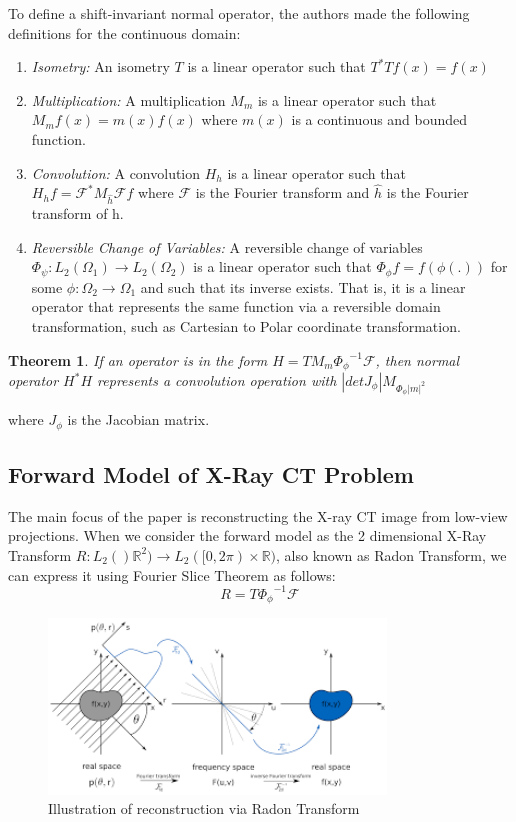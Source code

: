 \documentclass[journal, onecolumn, 11pt]{IEEEtran}
\newtheorem{theorem}{Theorem}
\begin{document}
To define a shift-invariant normal operator, the authors made the following definitions for the continuous domain: 
\begin{enumerate}
    \item \textit{Isometry:} An isometry $T$ is a linear operator such that $T^\ast T {f}(x) = f(x)$
    \item \textit{Multiplication:} A multiplication $M_m$ is a linear operator such that $M_m{f}(x) = m(x)f(x)$ where $m(x)$ is a continuous and bounded function.  
    \item \textit{Convolution:} A convolution $H_h$ is a linear operator such that $H_hf = \mathcal{F}^\ast M_{\hat{h}} \mathcal{F} f$ where $\mathcal{F}$ is the Fourier transform and $\hat{h}$ is the Fourier transform of h. 
    \item \textit{Reversible Change of Variables:} A reversible change of variables $\Phi_\psi: L_2(\Omega_1) \rightarrow L_2(\Omega_2)$ is a linear operator such that $\Phi_\phi f = f(\phi(.))$ for some $\phi: \Omega_2 \rightarrow \Omega_1$ and such that its inverse exists. That is, it is a linear operator that represents the same function via a reversible domain transformation, such as Cartesian to Polar coordinate transformation. 
\end{enumerate}

\begin{theorem}
    If an operator is in the form $H = TM_m{\Phi_\phi}^{-1}\mathcal{F}$, then normal operator $H^\ast H$ represents a convolution operation with $|det J_\phi| M_{\Phi_\phi |m|^2}$
    \label{thrm:Theorem1}
\end{theorem}
where $J_\phi$ is the Jacobian matrix.

\subsection{Forward Model of X-Ray CT Problem}
The main focus of the paper is reconstructing the X-ray CT image from low-view projections. When we consider the forward model as the 2 dimensional X-Ray Transform $R: L_2()\mathbb{R}^2) \rightarrow L_2([0,2\pi) \times \mathbb{R})$, also known as Radon Transform, we can express it using Fourier Slice Theorem as follows: 
\begin{equation}
    R = T {\Phi_\phi}^{-1} \mathcal{F}
    \label{eq:RadonTransform}
\end{equation}

\begin{figure}[h]
\centering
\includegraphics[width=0.8\textwidth]{images/images.png}
\caption{Illustration of reconstruction via Radon Transform \cite{radonimg}}\label{fig:radonimg}
\end{figure}
\end{document}
